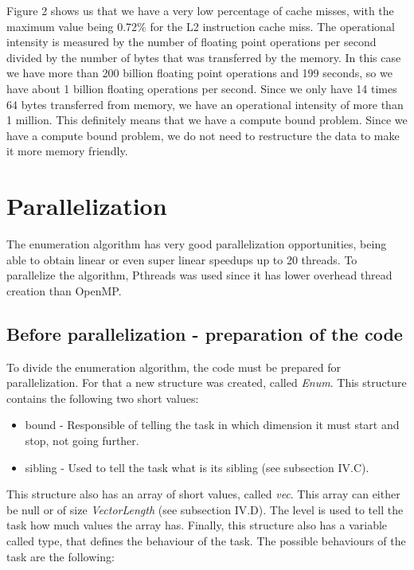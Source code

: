 \documentclass[conference]{IEEEtran}
\begin{document}
Figure 2 shows us that we have a very low percentage of cache misses, with the maximum value being 0.72\% for the L2 instruction cache miss. The operational intensity is measured by the number of floating point operations per second divided by the number of bytes that was transferred by the memory. In this case we have more than 200 billion floating point operations and 199 seconds, so we have about 1 billion floating operations per second. Since we only have 14 times 64 bytes transferred from memory, we have an operational intensity of more than 1 million. This definitely means that we have a compute bound problem. 
Since we have a compute bound problem, we do not need to restructure the data to make it more memory friendly.

\section{Parallelization}
The enumeration algorithm has very good parallelization opportunities, being able to obtain linear or even super linear speedups up to 20 threads.
To parallelize the algorithm, Pthreads was used since it has lower overhead thread creation than OpenMP.

\subsection{Before parallelization - preparation of the code}
To divide the enumeration algorithm, the code must be prepared for parallelization. For that a new structure was created, called \emph{Enum}. This structure contains the following two short values:

\begin{itemize}
\item bound - Responsible of telling the task in which dimension it must start and stop, not going further.
\item sibling - Used to tell the task what is its sibling (see subsection IV.C).
\end{itemize}

This structure also has an array of short values, called \emph{vec}. This array can either be null or of size \emph{VectorLength} (see subsection IV.D). The level is used to tell the task how much values the array has.
Finally, this structure also has a variable called type, that defines the behaviour of the task. The possible behaviours of the task are the following:
\end{document}
